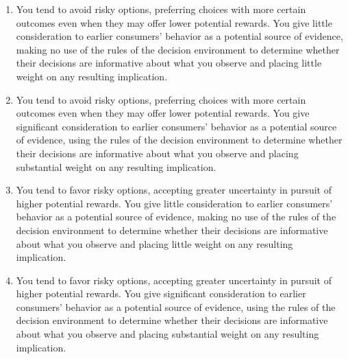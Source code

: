 \documentclass[12pt,letterpaper]{article}
\begin{document}
\begin{tcolorbox}[
    colback=white,
    colframe=black,
    colbacktitle=white,
    coltitle=black,
    boxrule=0.5pt,
    arc=2mm,
    left=3mm,
    right=3mm,
    top=2mm,
    bottom=2mm,
    fonttitle=\large\bfseries,
    title={Context Navigation Candidates for
        \textcolor{red!70!black}{Kremer and Debo (2016)}}
]
\ttfamily
\begin{enumerate}
    \renewcommand{\labelenumi}{\arabic{enumi}.}
    \setlength{\itemsep}{\baselineskip}
    \setlength{\parsep}{0pt}

    \item You tend to avoid risky options, preferring choices with more certain outcomes even when they may offer lower potential rewards. You give little consideration to earlier consumers' behavior as a potential source of evidence, making no use of the rules of the decision environment to determine whether their decisions are informative about what you observe and placing little weight on any resulting implication.

    \item You tend to avoid risky options, preferring choices with more certain outcomes even when they may offer lower potential rewards. You give significant consideration to earlier consumers' behavior as a potential source of evidence, using the rules of the decision environment to determine whether their decisions are informative about what you observe and placing substantial weight on any resulting implication.

    \item You tend to favor risky options, accepting greater uncertainty in pursuit of higher potential rewards. You give little consideration to earlier consumers' behavior as a potential source of evidence, making no use of the rules of the decision environment to determine whether their decisions are informative about what you observe and placing little weight on any resulting implication.

    \item You tend to favor risky options, accepting greater uncertainty in pursuit of higher potential rewards. You give significant consideration to earlier consumers' behavior as a potential source of evidence, using the rules of the decision environment to determine whether their decisions are informative about what you observe and placing substantial weight on any resulting implication.
\end{enumerate}
\end{tcolorbox}
\end{document}
